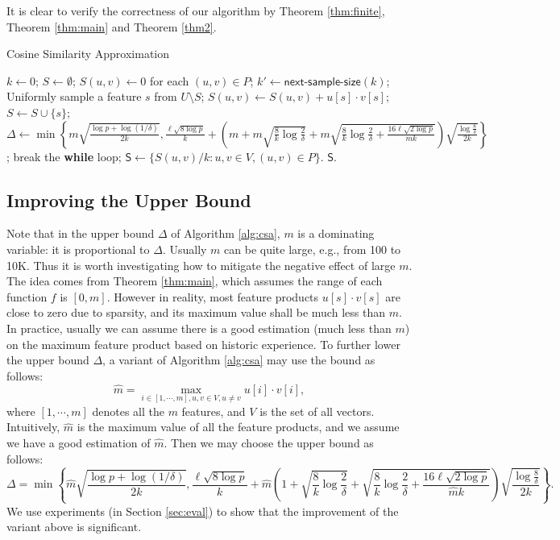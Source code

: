 \documentclass{article}
\begin{document}
It is clear to verify the correctness of our algorithm by Theorem \ref{thm:finite}, Theorem \ref{thm:main} and Theorem \ref{thm2}.

\begin{algorithm}[!t]
\caption{\textsf{Cosine Similarity Approximation}}
\label{alg:csa}
\renewcommand{\algorithmicrequire}{\textbf{Input:}}
\renewcommand{\algorithmicensure}{\textbf{Output:}}
\begin{algorithmic}
\State $k \gets 0$;
\State $S \gets \emptyset$;
\State $S(u,v) \gets 0$ for each $(u, v) \in P$;
	\State $k' \gets \textsf{next-sample-size}(k)$;
		\State Uniformly sample a feature $s$ from $U\setminus S$;
		\State $S(u,v) \gets S(u,v)+u[s]\cdot v[s]$;
		\State $S \gets S\cup \{s\}$;
	\EndFor
	\State $\Delta \gets \min\left\{m\sqrt{\frac{\log p + \log(1/\delta)}{2k}}, \frac{\ell\sqrt{8\log p}}{k} +\left(m+m\sqrt{\frac{8}{k}\log \frac{2}{\delta}} + m\sqrt{\frac{8}{k}\log \frac{2}{\delta} + \frac{16\ell\sqrt{2\log p}}{mk}}\right)\sqrt{\frac{\log \frac{8}{\delta}}{2k}}\right\}$;
	\If {$\Delta \leq \epsilon$}
		\State break the {\bf while} loop;
	\EndIf
\EndWhile
\State $\mathsf{S} \gets \{S(u,v)/k : u,v\in V, (u,v)\in P\}$.
 $\mathsf{S}$.
\end{algorithmic}
\end{algorithm}

\subsection{Improving the Upper Bound}
\label{sec:imprb}
Note that in the upper bound $\Delta$ of Algorithm \ref{alg:csa}, $m$ is a dominating variable: it is proportional to $\Delta$. Usually $m$ can be quite large, e.g., from 100 to 10K. Thus it is worth investigating how to mitigate the negative effect of large $m$. The idea comes from Theorem \ref{thm:main}, which assumes the range of each function $f$ is $[0,m]$. However in reality, most feature products $u[s]\cdot v[s]$ are close to zero due to sparsity, and its maximum value shall be much less than $m$. In practice, usually we can assume there is a good estimation (much less than $m$) on the maximum feature product based on historic experience. To further lower the upper bound $\Delta$, a variant of Algorithm \ref{alg:csa} may use the bound as follows:
$$\hat{m} = \max_{i\in [1,\cdots,m], u,v \in V, u\not= v}u[i]\cdot v[i],$$
where $[1,\cdots,m]$ denotes all the $m$ features, and $V$ is the set of all vectors. Intuitively, $\hat{m}$ is the maximum value of all the feature products, and we assume we have a good estimation of $\hat{m}$. 
Then we may choose the upper bound as follows:
$$\Delta = \min\left\{\hat{m}\sqrt{\frac{\log p + \log(1/\delta)}{2k}}, \frac{\ell\sqrt{8\log p}}{k} +\hat{m}\left(1+\sqrt{\frac{8}{k}\log \frac{2}{\delta}} + \sqrt{\frac{8}{k}\log \frac{2}{\delta} + \frac{16\ell\sqrt{2\log p}}{\hat{m}k}}\right)\sqrt{\frac{\log \frac{8}{\delta}}{2k}}\right\}.$$
We use experiments (in Section \ref{sec:eval}) to show that the improvement of the variant above is significant. 
\end{document}
